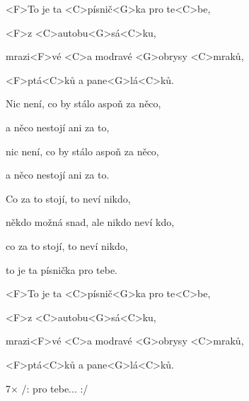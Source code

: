 

\zs
<F>To je ta <C>písnič<G>ka pro te<C>be,

<F>z <C>autobu<G>sá<C>ku,

mrazi<F>vé <C>a modravé <G>obrysy <C>mraků,

<F>ptá<C>ků a pane<G>lá<C>ků.
\ks

\zs
Nic není, co by stálo aspoň za něco,

a něco nestojí ani za to,

nic není, co by stálo aspoň za něco,

a něco nestojí ani za to.
\ks

\zs
Co za to stojí, to neví nikdo,

někdo možná snad, ale nikdo neví kdo,

co za to stojí, to neví nikdo,

to je ta písnička pro tebe.
\ks

\zs
<F>To je ta <C>písnič<G>ka pro te<C>be,

<F>z <C>autobu<G>sá<C>ku,

mrazi<F>vé <C>a modravé <G>obrysy <C>mraků,

<F>ptá<C>ků a pane<G>lá<C>ků.
\ks

7× /: pro tebe... :/

\kp
